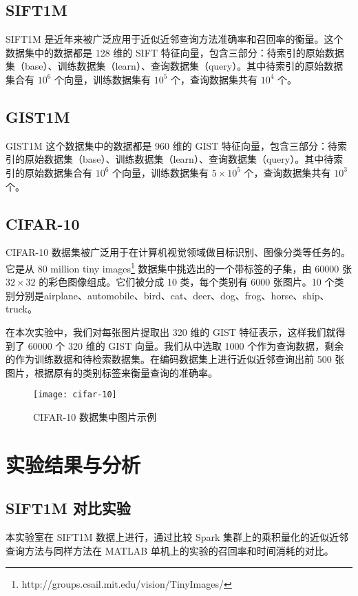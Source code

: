 \subsection{SIFT1M}
SIFT1M 是近年来被广泛应用于近似近邻查询方法准确率和召回率的衡量。这个数据集中的数据都是 128 维的 SIFT 特征向量，包含三部分：待索引的原始数据集（base）、训练数据集（learn）、查询数据集（query）。其中待索引的原始数据集合有 $10^6$ 个向量，训练数据集有 $10^5$ 个，查询数据集共有 $10^4$ 个。
\subsection{GIST1M}
GIST1M 这个数据集中的数据都是 960 维的 GIST 特征向量，包含三部分：待索引的原始数据集（base）、训练数据集（learn）、查询数据集（query）。其中待索引的原始数据集合有 $10^6$ 个向量，训练数据集有 $5\times10^5$ 个，查询数据集共有 $10^3$ 个。
\subsection{CIFAR-10}
CIFAR-10 数据集被广泛用于在计算机视觉领域做目标识别、图像分类等任务的。它是从 80 million tiny images\footnote{http://groups.csail.mit.edu/vision/TinyImages/} 数据集中挑选出的一个带标签的子集，由 60000 张 $32\times 32$ 的彩色图像组成。它们被分成 10 类，每个类别有 6000 张图片。10 个类别分别是airplane、automobile、bird、cat、deer、dog、frog、horse、ship、truck。

在本次实验中，我们对每张图片提取出 320 维的 GIST 特征表示，这样我们就得到了 60000 个 320 维的 GIST 向量。我们从中选取 1000 个作为查询数据，剩余的作为训练数据和待检索数据集。在编码数据集上进行近似近邻查询出前 500 张图片，根据原有的类别标签来衡量查询的准确率。

\begin{figure}[H]
  \centering
  \texttt{[image: cifar-10]}
  \caption{CIFAR-10 数据集中图片示例}
  \label{fig:cifar-10}
\end{figure}
\section{实验结果与分析}
\subsection{SIFT1M 对比实验}
本实验室在 SIFT1M 数据上进行，通过比较 Spark 集群上的乘积量化的近似近邻查询方法与同样方法在 MATLAB 单机上的实验的召回率和时间消耗的对比。

